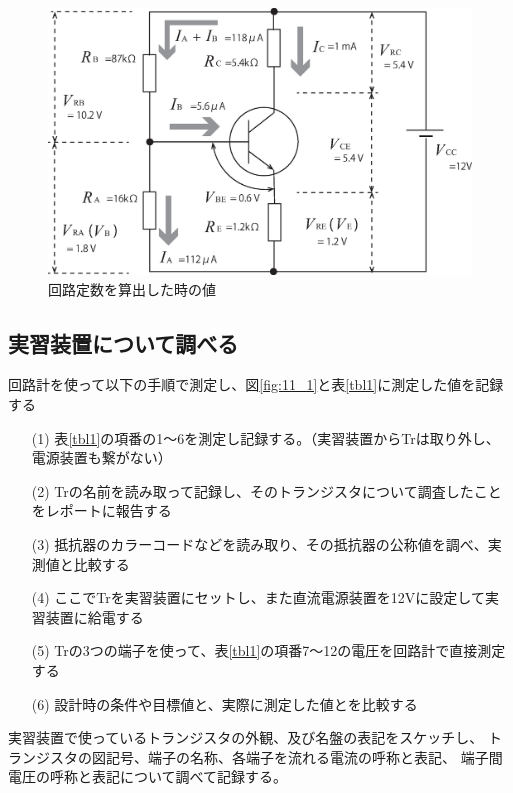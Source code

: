 \documentclass[uplatex,a4paper,11pt,oneside,openany]{jsbook}
\begin{document}
\begin{figure}[H]
  \centering
   \includegraphics[keepaspectratio, scale=0.45, angle=0]
               {figs/eps/p96fig3a.eps}
               \caption{回路定数を算出した時の値}
               \label{fig:11_2}
\end{figure}

\subsection{実習装置について調べる}

回路計を使って以下の手順で測定し、図\ref{fig:11_1}と表\ref{tbl1}に測定した値を記録する

\begin{enumerate}
\item[(1)] 表\ref{tbl1}の項番の1〜6を測定し記録する。（実習装置からTrは取り外し、電源装置も繋がない）
\item[(2)] Trの名前を読み取って記録し、そのトランジスタについて調査したことをレポートに報告する
\item[(3)] 抵抗器のカラーコードなどを読み取り、その抵抗器の公称値を調べ、実測値と比較する
\item[(4)] ここでTrを実習装置にセットし、また直流電源装置を12Vに設定して実習装置に給電する
\item[(5)] Trの3つの端子を使って、表\ref{tbl1}の項番7〜12の電圧を回路計で直接測定する
\item[(6)] 設計時の条件や目標値と、実際に測定した値とを比較する
\end{enumerate}

実習装置で使っているトランジスタの外観、及び名盤の表記をスケッチし、
トランジスタの図記号、端子の名称、各端子を流れる電流の呼称と表記、
端子間電圧の呼称と表記について調べて記録する。\\
\end{document}
